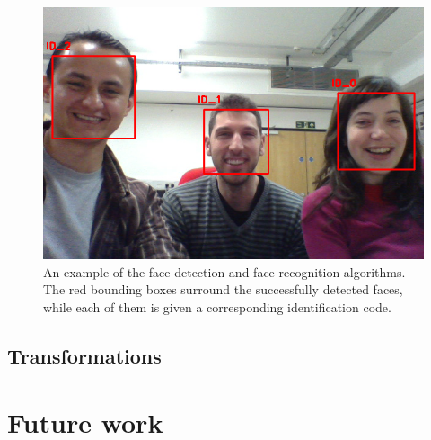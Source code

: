 \documentclass[conference]{IEEEtran}
\begin{document}
\begin{figure}[!t]
\centering
\includegraphics[width=3.in]{BARC_FaceRec.png}
\caption{An example of the face detection and face recognition algorithms. The red bounding boxes surround the successfully detected faces, while each of them is given a corresponding identification code.}
\label{fig:face}
\end{figure}

\subsection{Transformations}

\section{Future work}


%
%
\end{document}
